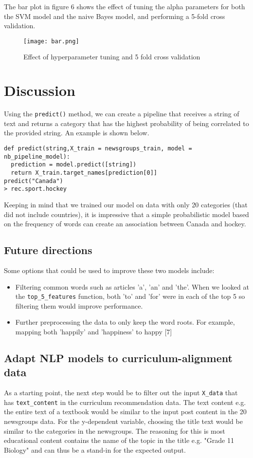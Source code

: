 \documentclass{article}
\begin{document}
The bar plot in figure 6 shows the effect of tuning the alpha parameters for both the SVM model and the naive Bayes model, and performing a 5-fold cross validation.
\begin{figure}[htp]
    \centering
    \texttt{[image: bar.png]}
    \caption{Effect of hyperparameter tuning and 5 fold cross validation}
    \label{fig:galaxy}
\end{figure} 
 
\section{Discussion}

Using the \texttt{predict()} method, we can create a pipeline that receives a string of text and returns a category that has the highest probability of being correlated to the provided string. An example is shown below.
\begin{lstlisting}
def predict(string,X_train = newsgroups_train, model = nb_pipeline_model):
  prediction = model.predict([string])
  return X_train.target_names[prediction[0]]
predict("Canada")
> rec.sport.hockey
\end{lstlisting}

Keeping in mind that we trained our model on data with only 20 categories (that did not include countries), it is impressive that a simple probabilistic model based on the frequency of words can create an association between Canada and hockey. 

\subsection{Future directions}
Some options that could be used to improve these two models include: 
\begin{itemize}
    \item Filtering common words such as articles 'a', 'an' and 'the'. When we looked at the \texttt{top\_5\_features} function, both 'to' and 'for' were in each of the top 5 so filtering them would improve performance.
    \item Further preprocessing the data to only keep the word roots. For example, mapping both 'happily' and 'happiness' to happy [7]
\end{itemize}

\subsection{Adapt NLP models to curriculum-alignment data} 
As a starting point, the next step would be to filter out the input \texttt{X\_data} that has \texttt{text\_content} in the curriculum recommendation data. The text content e.g. the entire text of a textbook would be similar to the input post content in the 20 newsgroups data. For the y-dependent variable, choosing the title text would be similar to the categories in the newsgroups. The reasoning for this is most educational content contains the name of the topic in the title e.g. "Grade 11 Biology" and can thus be a stand-in for the expected output. 
\end{document}
